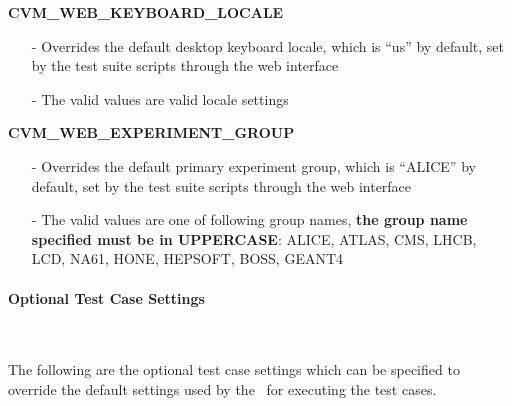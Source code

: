 \begin{description}
\item {\bf CVM\_WEB\_KEYBOARD\_LOCALE}
		\begin{itemize}
		\item[-]	Overrides the default \cernvm desktop keyboard locale, which is ``us'' by
				default, set by the test suite scripts through the web interface
		\item[-]	The valid values are valid locale settings
		\end{itemize}

\item {\bf CVM\_WEB\_EXPERIMENT\_GROUP}
		\begin{itemize}
		\item[-]	Overrides the default \cernvm primary experiment group, which is ``ALICE''
				by default, set by the test suite scripts through the web interface
		\item[-]	The valid values are one of following group names, {\bf the group name
				specified must be in UPPERCASE}: ALICE, ATLAS, CMS, LHCB, LCD, NA61, HONE,
				HEPSOFT, BOSS, GEANT4	
		\end{itemize}
\end{description}


\paragraph*{Optional Test Case Settings}~\newline

The following are the optional test case settings which can be specified to override
the default settings used by the \cernvmtestframework\ for executing the \cernvmreleasetesting
test cases.


